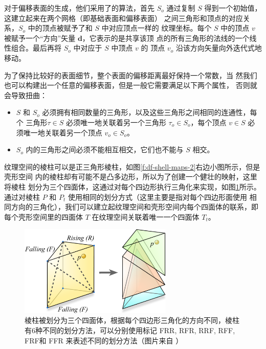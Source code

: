 对于偏移表面的生成，他们采用了\cite{a:SimplificationEnvelopes}的算法，首先 $S_o$ 通过复制 $S$ 得到一个初始值，这建立起来在两个网格（即基础表面和偏移表面） 之间三角形和顶点的对应关系，$S_o$ 中的顶点被赋予了和 $S$ 中对应顶点一样的 纹理坐标。每个 $S$ 中的顶点 ${v}$ 被赋予一个“方向”矢量 $\mathbf{d}$，它表示的是共享该顶 点的所有三角形的法线的一个线性组合。最后再将 $S_o$ 中对应于 $S$ 中顶点 ${v}$ 的 顶点 ${v}_o$ 沿该方向矢量向外迭代式地移动。

为了保持比较好的表面细节，整个表面的偏移距离最好保持一个常数，当 然我们也可以构建出一个任意的偏移表面，但是一般它需要满足以下两个属性， 否则就会导致扭曲：

\begin{itemize}
	\item $S$ 和 $S_o$ 必须拥有相同数量的三角形，以及这些三角形之间相同的连通性，每个 三角形$\tau\in S$ 必须唯一地关联着另一个三角形 $\tau_o \in S_o$，每个顶点 ${v}\in S$ 必 须唯一地关联着另一个顶点 ${v}_o\in S_o$。
	\item $S_o$ 内的三角形之间必须不能相互相交，它们也不能与 $S$ 相交。
\end{itemize}


纹理空间的棱柱可以是正三角形棱柱，如图\ref{f:df-shell-maps-2}右边小图所示，但是壳形空间 内的棱柱却有可能不是凸多边形，所以为了创建一个健壮的映射，这里将棱柱 划分为三个四面体，这通过对每个四边形执行三角化来实现，如图\ref{f:df-shell-maps-3}所示。 通过对棱柱 $P$ 和 $P_t$ 使用相同的划分方式（这里主要是指对每个四边形面使用 相同方向的三角化），我们可以建立起纹理空间和壳形空间内每个四面体的联系，即每个壳形空间里的四面体 $T$ 在纹理空间关联着唯一一个四面体 $T_t$。

\begin{figure}
	\sidecaption
	\includegraphics[width=0.65\textwidth]{figures/df/shell-maps-3}
	\caption{棱柱被划分为三个四面体，根据每个四边形三角化的方向不同，棱柱有6种不同的划分方法，可以分别使用标记 FRR, RFR, RRF, RFF, FRF和 FFR 来表述不同的划分方法（图片来自 \cite{a:Shell-Maps}）}
	\label{f:df-shell-maps-3}
\end{figure}

